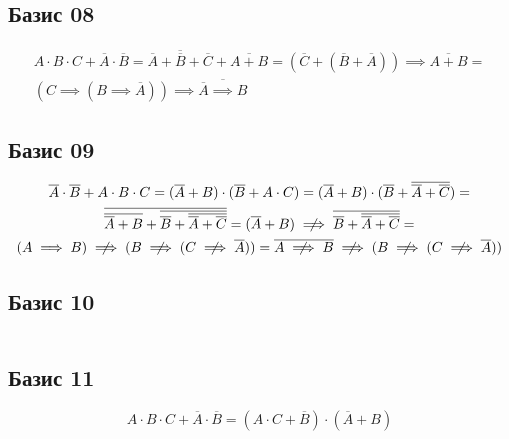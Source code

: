 \documentclass[a4paper,10pt]{article} %
\begin{document}
	
	\subsection{Базис 08}
	
	\begin{multline*}
		A \cdot B \cdot C + \overline{A}\cdot \overline{B} =
		\overline{\overline{A} + \overline{B} + \overline{C}} + \overline{A + B} =
		(\overline{C} + (\overline{B} + \overline{A})) \implies \overline{A + B} = \\
		(C \implies (B \implies \overline{A})) \implies 
		\overline{\overline{A} \implies B} 
	\end{multline*}
	
	\subsection{Базис 09}

	\begin{multline*}
		\overline{A} \cdot \overline{B} + A \cdot B \cdot C = 
		(\overline{A} + B) \cdot (\overline{B} + A \cdot C) = 
		(\overline{A}+ B) \cdot 
		(\overline{B} + \overline{\overline{A} + \overline{C}}) = \\
		\overline{\overline{\overline{A} + B} +
		\overline{\overline{B} + \overline{\overline{A} + \overline{C}}}} = 
		(\overline{A} + B) \centernot\implies 
		\overline{\overline{B} + \overline{\overline{A} + \overline{C}}} =\\
		(A \implies B) \centernot\implies 
		(B \centernot\implies (C \centernot\implies \overline{A})) =
		\overline{A \centernot\implies B} \centernot\implies 
		(B \centernot\implies (C \centernot\implies \overline{A}))
	\end{multline*}
	
	\subsection{Базис 10}
	
	\begin{equation}
		
	\end{equation}
	
	\subsection{Базис 11}
	
	\begin{equation}
		A \cdot B \cdot C + \overline{A} \cdot \overline{B} = 
		(A \cdot C + \overline{B}) \cdot (\overline{A} + B)
	\end{equation}
	
\end{document}
